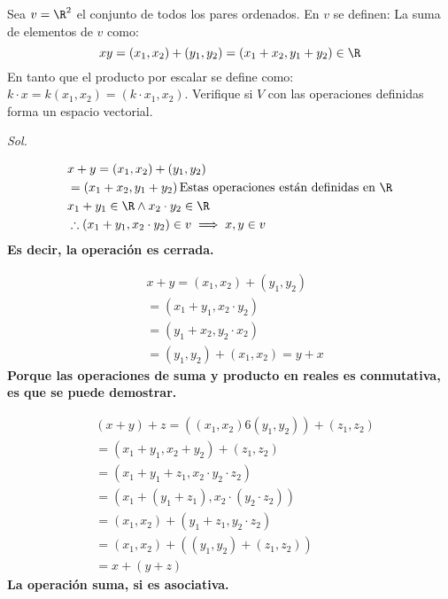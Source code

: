 \begin{example}
	Sea $v=\R^2$ el conjunto de todos los pares ordenados. En $v$ se definen: La suma de elementos de $v$ como:
	\begin{equation*}
		xy=\left(x_1,x_2\right)+\left(y_1,y_2\right)=\left(x_1+x_2,y_1+y_2\right)\in \R
	\end{equation*}
	En tanto que el producto por escalar se define como: $k\cdot x=k\left(x_1,x_2\right)=\left(k\cdot x_1, x_2\right)$. Verifique si $V$ con las operaciones definidas forma un espacio vectorial.
\end{example}

\textit{ Sol. }

\begin{exercise}[Sean $x,y\in v(v=\R)\implies x+y\in v$]
	\begin{align*}
		 & x+y=\left(x_1,x_2\right)+\left(y_1,y_2\right)                                \\
		 & =\left(x_1+x_2,y_1+y_2\right) \text{Estas operaciones están definidas en }\R \\
		 & x_1+y_1\in \R\land x_2\cdot y_2\in \R                                        \\
		 & \therefore \left(x_1+y_1,x_2\cdot y_2\right)\in v\implies x,y\in v
	\end{align*}
	\textbf{Es decir, la operación es cerrada.}
\end{exercise}

\begin{exercise}[Si $x,y\in v\implies x+y=y+x$]
	\begin{align*}
		 & x+y=\left(x_1,x_2\right)+\left(y_1,y_2\right)  \\
		 & =\left(x_1+y_1,x_2\cdot y_2\right)             \\
		 & =\left(y_1+x_2,y_2\cdot x_2\right)             \\
		 & =\left(y_1,y_2\right)+\left(x_1,x_2\right)=y+x
	\end{align*}
	\textbf{Porque las operaciones de suma y producto en reales es conmutativa, es que se puede demostrar. }
\end{exercise}

\begin{exercise}[Si $x,y,z\in v\implies (x+y)+z=x+(y+z)$]
	\begin{align*}
		 & (x+y)+z=((x_1,x_2)6(y_1,y_2))+(z_1,z_2)  \\
		 & =(x_1+y_1,x_2+y_2)+(z_1,z_2)             \\
		 & =(x_1+y_1+z_1,x_2\cdot y_2\cdot z_2)     \\
		 & =(x_1+(y_1+z_1),x_2\cdot (y_2\cdot z_2)) \\
		 & =(x_1,x_2)+(y_1+z_1,y_2\cdot z_2)        \\
		 & =(x_1,x_2)+((y_1,y_2)+(z_1,z_2))         \\
		 & =x+(y+z)
	\end{align*}
	\textbf{La operación suma, si es asociativa.}
\end{exercise}

